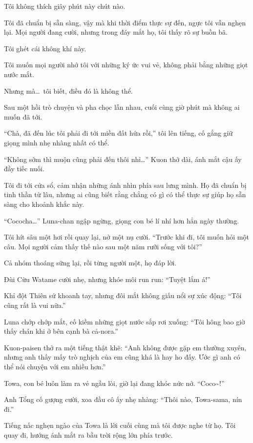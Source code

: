 \documentclass[../main.tex]{subfiles}
\begin{document}
\ct

Tôi không thích giây phút này chút nào.

Tôi đã chuẩn bị sẵn sàng, vậy mà khi thời điểm thực sự đến, ngực tôi vẫn nghẹn lại. Mọi người đang cười, nhưng trong đáy mắt họ, tôi thấy rõ sự buồn bã.

Tôi ghét cái không khí này.

Tôi muốn mọi người nhớ tôi với những ký ức vui vẻ, không phải bằng những giọt nước mắt.

Nhưng mà\dots\ tôi biết, điều đó là không thể.

Sau một hồi trò chuyện và pha chọc lẫn nhau, cuối cùng giờ phút mà không ai muốn đã tới.

``Chà, đã đến lúc tôi phải đi tới miền đất hứa rồi,'' tôi lên tiếng, cố gắng giữ giọng mình nhẹ nhàng nhất có thể.

``Không sớm thì muộn cũng phải đến thôi nhỉ\dots'' Kuon thở dài, ánh mắt cậu ấy đầy tiếc nuối.

Tôi đi tới cửa sổ, cảm nhận những ánh nhìn phía sau lưng mình. Họ đã chuẩn bị tinh thần từ lâu, nhưng ai cũng biết rằng chẳng có gì có thể thực sự giúp họ sẵn sàng cho khoảnh khắc này.


``Cococha\dots'' Luna-chan ngập ngừng, giọng con bé lí nhí hơn hẳn ngày thường.

Tôi hít sâu một hơi rồi quay lại, nở một nụ cười. ``Trước khi đi, tôi muốn hỏi một câu. Mọi người cảm thấy thế nào sau một năm rưỡi sống với tôi?''

Cả nhóm thoáng sững lại, rồi từng người một, họ đáp lời.

Đùi Cừu Watame cười nhẹ, nhưng khóe môi run run: ``Tuyệt lắm á!''

Khỉ đột Thiên sứ khoanh tay, nhưng đôi mắt không giấu nổi sự xúc động: ``Tôi cũng rất là vui nữa.''

Luna chớp chớp mắt, cố kiềm những giọt nước sắp rơi xuống: ``Tôi hông bao giờ thấy chán khi ở bên cạnh bà cả-nora.''

Kuon-paisen thở ra một tiếng thật khẽ: ``Anh không được gặp em thường xuyên, nhưng anh thấy mấy trò nghịch của em cũng khá là hay ho đấy. Ước gì anh có thể nói chuyện với em nhiều hơn.''

Towa, con bé luôn làm ra vẻ ngầu lòi, giờ lại đang khóc nức nở. ``Coco\~{}!''

Anh Tổng cố gượng cười, xoa đầu cô ấy nhẹ nhàng: ``Thôi nào, Towa-sama, nín đi.''

Tiếng nấc nghẹn ngào của Towa là lời cuối cùng mà tôi được nghe từ họ. Tôi quay đi, hướng ánh mắt ra bầu trời rộng lớn phía trước.
\end{document}
